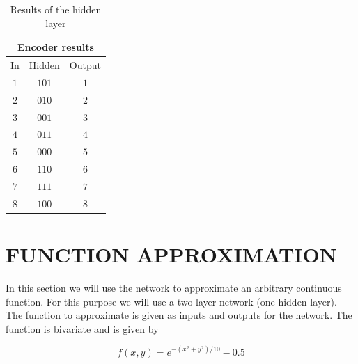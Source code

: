 \documentclass[letterpaper, 10 pt, conference]{ieeeconf}  %
\begin{document}
\begin{table}
\begin{center}
\begin{tabular}{ |c|c|c|  }
\hline
 \multicolumn{3}{|c|}{Encoder results} \\
 \hline
In & Hidden & Output \\
 \hline
 $1$ & $101$ & $1$ \\
 $2$ & $010$ & $2$ \\
 $3$ & $001$ & $3$ \\
 $4$ & $011$ & $4$ \\
 $5$ & $000$ & $5$ \\
 $6$ & $110$ & $6$ \\
 $7$ & $111$ & $7$ \\
 $8$ & $100$ & $8$ \\
 \hline
\end{tabular}
\end{center}
\caption{Results of the hidden layer}
 \label{t:1}
\end{table}

\section{FUNCTION APPROXIMATION}
In this section we will use the network to approximate an arbitrary continuous function. For this purpose we will use a two layer network (one hidden layer). The function to approximate is given as inputs and outputs for the network. The function is bivariate and is given by

$$
f(x,y) = e^{-(x^2+y^2)/10}-0.5
$$
\end{document}
